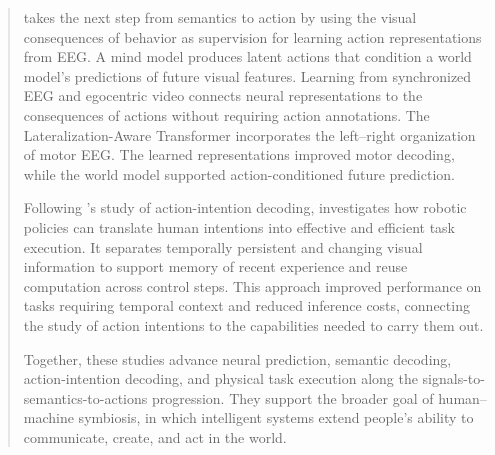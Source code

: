 \begin{abstract}
\mwm{} takes the next step from semantics to action by using the visual consequences of behavior as supervision for learning action representations from EEG. A mind model produces latent actions that condition a world model's predictions of future visual features. Learning from synchronized EEG and egocentric video connects neural representations to the consequences of actions without requiring action annotations. The Lateralization-Aware Transformer incorporates the left--right organization of motor EEG. The learned representations improved motor decoding, while the world model supported action-conditioned future prediction.

Following \mwm{}'s study of action-intention decoding, \dysta{} investigates how robotic policies can translate human intentions into effective and efficient task execution. It separates temporally persistent and changing visual information to support memory of recent experience and reuse computation across control steps. This approach improved performance on tasks requiring temporal context and reduced inference costs, connecting the study of action intentions to the capabilities needed to carry them out.

Together, these studies advance neural prediction, semantic decoding, action-intention decoding, and physical task execution along the signals-to-semantics-to-actions progression. They support the broader goal of human--machine symbiosis, in which intelligent systems extend people's ability to communicate, create, and act in the world.

\end{abstract}
